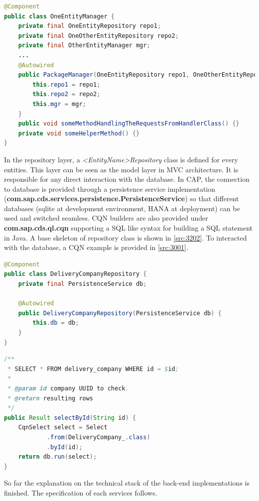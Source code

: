 \begin{lstlisting}[language={java}]
@Component
public class OneEntityManager {
    private final OneEntityRepository repo1;
    private final OneOtherEntityRepository repo2;
    private final OtherEntityManager mgr;
    ...
    @Autowired
    public PackageManager(OneEntityRepository repo1, OneOtherEntityRepository repo2, OtherEntityManager mgr) {
        this.repo1 = repo1;
        this.repo2 = repo2;
        this.mgr = mgr;
    }
    public void someMethodHandlingTheRequestsFromHandlerClass() {}
    private void someHelperMethod() {}
}
\end{lstlisting}


\bigskip
In the repository layer, a \textit{<EntityName>Repository} class is defined for every entities. This layer can be seen as the model layer in MVC architecture. It is responsible for any direct interaction with the database. In CAP, the connection to database is provided through a persistence service implementation (\textbf{com.sap.cds.services.persistence.PersistenceService}) so that different databases (sqlite at development environment, HANA at deployment) can be used and switched seamless. CQN builders are also provided under \textbf{com.sap.cds.ql.cqn} supporting a SQL like syntax for building a SQL statement in Java.
A base skeleton of repository class is shown in \autoref{src:3202}.
To interacted with the database, a CQN example is provided in \autoref{src:3001}.

\begin{lstlisting}[language={java}]
@Component
public class DeliveryCompanyRepository {
    private final PersistenceService db;

    @Autowired
    public DeliveryCompanyRepository(PersistenceService db) {
        this.db = db;
    }
}
\end{lstlisting}

\begin{lstlisting}[language={java}]
/**
 * SELECT * FROM delivery_company WHERE id = $id;
 *
 * @param id company UUID to check.
 * @return resulting rows
 */
public Result selectById(String id) {
    CqnSelect select = Select
            .from(DeliveryCompany_.class)
            .byId(id);
    return db.run(select);
}
\end{lstlisting}

So far the explanation on the technical stack of the back-end implementations is finished. The specification of each services follows.


